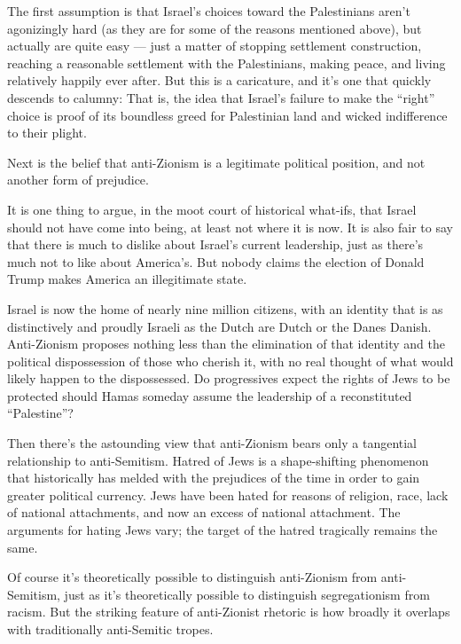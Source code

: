 The first assumption is that Israel's choices toward the Palestinians
aren't agonizingly hard (as they are for some of the reasons mentioned
above), but actually are quite easy --- just a matter of stopping
settlement construction, reaching a reasonable settlement with the
Palestinians, making peace, and living relatively happily ever after.
But this is a caricature, and it's one that quickly descends to calumny:
That is, the idea that Israel's failure to make the ``right'' choice is
proof of its boundless greed for Palestinian land and wicked
indifference to their plight.

Next is the belief that anti-Zionism is a legitimate political position,
and not another form of prejudice.

It is one thing to argue, in the moot court of historical what-ifs, that
Israel should not have come into being, at least not where it is now. It
is also fair to say that there is much to dislike about Israel's current
leadership, just as there's much not to like about America's. But nobody
claims the election of Donald Trump makes America an illegitimate state.

Israel is now the home of nearly nine million citizens, with an identity
that is as distinctively and proudly Israeli as the Dutch are Dutch or
the Danes Danish. Anti-Zionism proposes nothing less than the
elimination of that identity and the political dispossession of those
who cherish it, with no real thought of what would likely happen to the
dispossessed. Do progressives expect the rights of Jews to be protected
should Hamas someday assume the leadership of a reconstituted
``Palestine''?

Then there's the astounding view that anti-Zionism bears only a
tangential relationship to anti-Semitism. Hatred of Jews is a
shape-shifting phenomenon that historically has melded with the
prejudices of the time in order to gain greater political currency. Jews
have been hated for reasons of religion, race, lack of national
attachments, and now an excess of national attachment. The arguments for
hating Jews vary; the target of the hatred tragically remains the same.

Of course it's theoretically possible to distinguish anti-Zionism from
anti-Semitism, just as it's theoretically possible to distinguish
segregationism from racism. But the striking feature of anti-Zionist
rhetoric is how broadly it overlaps with traditionally anti-Semitic
tropes.

